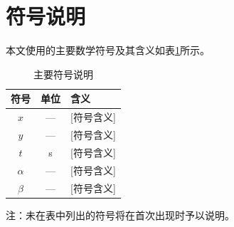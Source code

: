 
\section{符号说明}

本文使用的主要数学符号及其含义如表\ref{tab:symbols}所示。

\begin{table}[H]
    \centering
    \caption{主要符号说明}
    \label{tab:symbols}
    \begin{tabular}{ccl}
        \toprule
        \textbf{符号} & \textbf{单位} & \textbf{含义} \\
        \midrule
        $x$      & —       & [符号含义] \\
        $y$      & —       & [符号含义] \\
        $t$      & s       & [符号含义] \\
        $\alpha$ & —       & [符号含义] \\
        $\beta$  & —       & [符号含义] \\
        \bottomrule
    \end{tabular}
\end{table}

注：未在表中列出的符号将在首次出现时予以说明。
